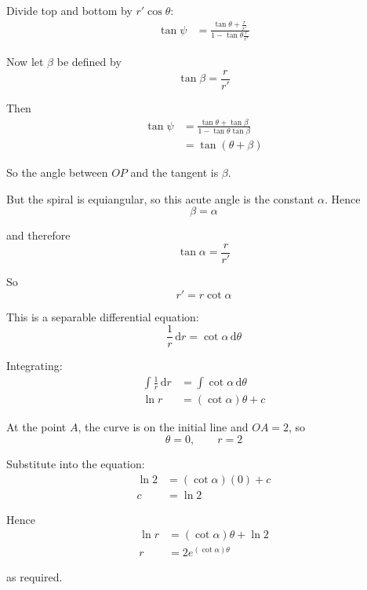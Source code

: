 \documentclass[leqno]{article}
\begin{document}
\begin{enumerate}[
  label=\textbf{\arabic*.},
  leftmargin=*,
  topsep=0pt,
  partopsep=0pt,
  parsep=0pt
]
\begin{djsSolution}
\begin{enumerate}[label=\textbf{(\alph*)}]
  Divide top and bottom by \(r'\cos\theta\):
  \begin{align*}
  \tan\psi
  &=\frac{\tan\theta+\frac{r}{r'}}{1-\tan\theta\frac{r}{r'}}
  \end{align*}

  Now let \(\beta\) be defined by
  \[
  \tan\beta=\frac{r}{r'}
  \]

  Then
  \begin{align*}
  \tan\psi
  &=\frac{\tan\theta+\tan\beta}{1-\tan\theta\tan\beta} \\
  &=\tan(\theta+\beta)
  \end{align*}

  So the angle between \(OP\) and the tangent is \(\beta\).

  But the spiral is equiangular, so this acute angle is the constant \(\alpha\). Hence
  \[
  \beta=\alpha
  \]

  and therefore
  \[
  \tan\alpha=\frac{r}{r'}
  \]

  So
  \[
  r'=r\cot\alpha
  \]

  This is a separable differential equation:
  \[
  \frac{1}{r}\,\mathrm{d}r=\cot\alpha\,\mathrm{d}\theta
  \]

  Integrating:
  \begin{align*}
  \int \frac{1}{r}\,\mathrm{d}r &= \int \cot\alpha\,\mathrm{d}\theta \\
  \ln r &= (\cot\alpha)\theta + c
  \end{align*}

  At the point \(A\), the curve is on the initial line and \(OA=2\), so
  \[
  \theta=0,\qquad r=2
  \]

  Substitute into the equation:
  \begin{align*}
  \ln 2 &= (\cot\alpha)(0)+c \\
  c&=\ln 2
  \end{align*}

  Hence
  \begin{align*}
  \ln r &= (\cot\alpha)\theta+\ln 2 \\
  r &= 2e^{(\cot\alpha)\theta}
  \end{align*}

  as required.
\end{enumerate}
\end{djsSolution}


\newpage

\questionitem

\begin{figure}[H]
    \centering
{}
\end{figure}
\end{enumerate}
\end{document}
